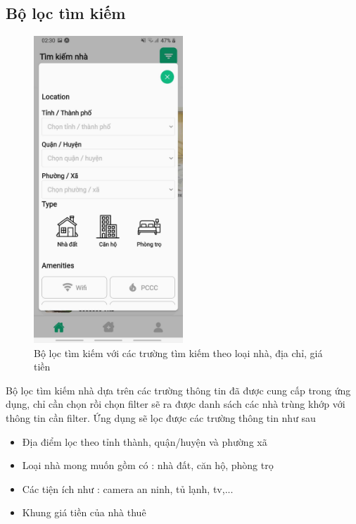 \subsection{Bộ lọc tìm kiếm}
\begin{figure}[H]
    \centering
    \includegraphics[width=0.5\textwidth]{Images/app_image/app_8.jpg}
    \caption{Bộ lọc tìm kiếm với các trường tìm kiếm theo loại nhà, địa chỉ, giá tiền}
\end{figure}
Bộ lọc tìm kiếm nhà dựa trên các trường thông tin đã được cung cấp trong ứng dụng, chỉ cần chọn rồi chọn filter sẽ ra được danh sách các nhà trùng khớp với thông tin cần filter. Ứng dụng sẽ lọc được các trường thông tin như sau
\begin{itemize}
    \item Địa điểm lọc theo tỉnh thành, quận/huyện và phường xã
    \item Loại nhà mong muốn gồm có : nhà đất, căn hộ, phòng trọ
    \item Các tiện ích như : camera an ninh, tủ lạnh, tv,...
    \item Khung giá tiền của nhà thuê
\end{itemize}

